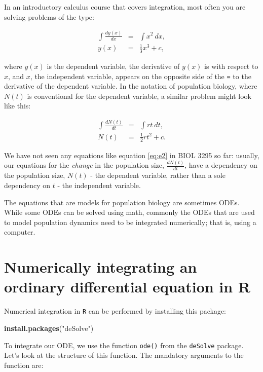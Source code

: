 \documentclass[]{book}
\newenvironment{Shaded}{\begin{snugshade}}{\end{snugshade}}
\newcommand{\KeywordTok}[1]{\textcolor[rgb]{0.13,0.29,0.53}{\textbf{{#1}}}}
\newcommand{\StringTok}[1]{\textcolor[rgb]{0.31,0.60,0.02}{{#1}}}
\newcommand{\NormalTok}[1]{{#1}}
\begin{document}
In an introductory calculus course that covers integration, most often
you are solving problems of the type:

\begin{eqnarray}
\int \frac{dy(x)}{dx} &=& \int x^2 \ dx, \\ \nonumber
y(x) &=& \frac{1}{3}x^3 + c,
\label{eq:e1}
\end{eqnarray}

where \(y(x)\) is the dependent variable, the derivative of \(y(x)\) is
with respect to \(x\), and \(x\), the independent variable, appears on
the opposite side of the \texttt{=} to the derivative of the dependent
variable. In the notation of population biology, where \(N(t)\) is
conventional for the dependent variable, a similar problem might look
like this:

\begin{eqnarray}
\int \frac{dN(t)}{dt} &=& \int rt \ dt, \\ \nonumber
N(t) &=& \frac{1}{2}rt^2 + c. 
\label{eq:e2}
\end{eqnarray}

We have not seen any equations like equation \eqref{eq:e2} in BIOL 3295 so
far: usually, our equations for the \emph{change} in the population
size, \(\frac{dN(t)}{dt}\), have a dependency on the population size,
\(N(t)\) - the dependent variable, rather than a sole dependency on
\(t\) - the independent variable.

The equations that are models for population biology are sometimes ODEs.
While some ODEs can be solved using math, commonly the ODEs that are
used to model population dynamics need to be integrated numerically;
that is, using a computer.

\section{Numerically integrating an ordinary differential equation in
R}\label{numerically-integrating-an-ordinary-differential-equation-in-r}

Numerical integration in \texttt{R} can be performed by installing this
package:

\begin{Shaded}
\begin{Highlighting}[]
\KeywordTok{install.packages}\NormalTok{(}\StringTok{"deSolve"}\NormalTok{)}
\end{Highlighting}
\end{Shaded}

To integrate our ODE, we use the function \texttt{ode()} from the
\texttt{deSolve} package. Let's look at the structure of this function.
The mandatory arguments to the function are:
\end{document}
